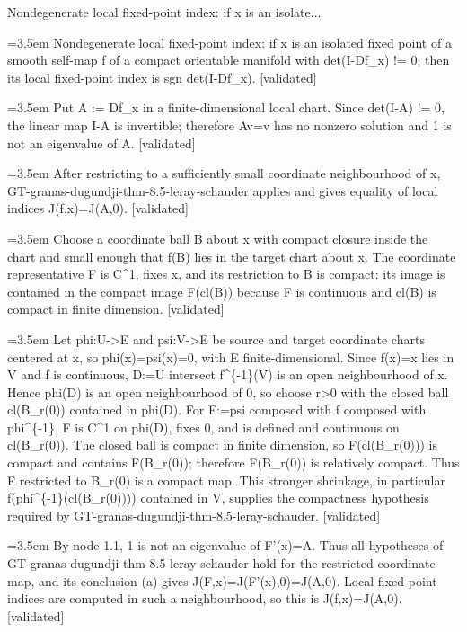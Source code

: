 \documentclass{article}
\newcommand{\step}[1]{\par\noindent\hangindent=3.5em\hangafter=1%
  \makebox[3.5em][l]{\textbf{#1.}}}
\newcommand{\steptag}[1]{\hfill{\small\textsf{[#1]}}}
\begin{document}
\begin{proofbox}{Nondegenerate local fixed-point index: if x is an isolate...}
\step{1} Nondegenerate local fixed-point index: if x is an isolated fixed point of a smooth self-map f of a compact orientable manifold with det(I-Df\_x) != 0, then its local fixed-point index is sgn det(I-Df\_x). \steptag{validated} \\[6pt]
\step{1.1} Put A := Df\_x in a finite-dimensional local chart. Since det(I-A) != 0, the linear map I-A is invertible; therefore Av=v has no nonzero solution and 1 is not an eigenvalue of A. \steptag{validated} \\[4pt]
\step{1.2} After restricting to a sufficiently small coordinate neighbourhood of x, GT-granas-dugundji-thm-8.5-leray-schauder applies and gives equality of local indices J(f,x)=J(A,0). \steptag{validated} \\[6pt]
\step{1.2.1} Choose a coordinate ball B about x with compact closure inside the chart and small enough that f(B) lies in the target chart about x. The coordinate representative F is C\textasciicircum{}1, fixes x, and its restriction to B is compact: its image is contained in the compact image F(cl(B)) because F is continuous and cl(B) is compact in finite dimension. \steptag{validated} \\[6pt]
\step{1.2.1.1} Let phi:U->E and psi:V->E be source and target coordinate charts centered at x, so phi(x)=psi(x)=0, with E finite-dimensional. Since f(x)=x lies in V and f is continuous, D:=U intersect f\textasciicircum{}\{-1\}(V) is an open neighbourhood of x. Hence phi(D) is an open neighbourhood of 0, so choose r>0 with the closed ball cl(B\_r(0)) contained in phi(D). For F:=psi composed with f composed with phi\textasciicircum{}\{-1\}, F is C\textasciicircum{}1 on phi(D), fixes 0, and is defined and continuous on cl(B\_r(0)). The closed ball is compact in finite dimension, so F(cl(B\_r(0))) is compact and contains F(B\_r(0)); therefore F(B\_r(0)) is relatively compact. Thus F restricted to B\_r(0) is a compact map. This stronger shrinkage, in particular f(phi\textasciicircum{}\{-1\}(cl(B\_r(0)))) contained in V, supplies the compactness hypothesis required by GT-granas-dugundji-thm-8.5-leray-schauder. \steptag{validated} \\[4pt]
\step{1.2.2} By node 1.1, 1 is not an eigenvalue of F'(x)=A. Thus all hypotheses of GT-granas-dugundji-thm-8.5-leray-schauder hold for the restricted coordinate map, and its conclusion (a) gives J(F,x)=J(F'(x),0)=J(A,0). Local fixed-point indices are computed in such a neighbourhood, so this is J(f,x)=J(A,0). \steptag{validated} \\[4pt]

\end{proofbox}
\end{document}
